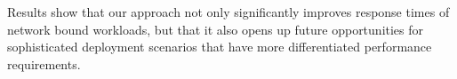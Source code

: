 Results show that our approach not only significantly improves response times of network bound workloads, but that it also opens up future opportunities for sophisticated deployment scenarios that have more differentiated performance requirements.


   